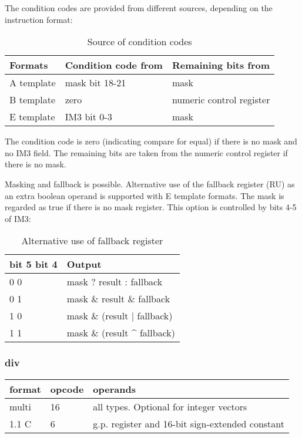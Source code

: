 \documentclass[forwardcom.tex]{subfiles}
\begin{document}
\vspace{2mm}
The condition codes are provided from different sources, depending on the instruction format:

\begin{longtable} {|p{25mm}|p{50mm}|p{50mm}|}
\caption{Source of condition codes} 
\label{table:SourceOfConditionCodes} \\
\endfirsthead
\endhead
\hline
\bfseries Formats & \bfseries Condition code from & \bfseries Remaining bits from \\
\hline
A template & mask bit 18-21 & mask \\
\hline
B template & zero & numeric control register \\
\hline
E template & IM3 bit 0-3 & mask \\
\hline
\end{longtable}

The condition code is zero (indicating compare for equal) if there is no mask and no IM3 field. The remaining bits are taken from the numeric control register if there is no mask.

\vspace{2mm}
Masking and fallback is possible. Alternative use of the fallback register (RU) as an extra boolean operand is supported with E template formats. The mask is regarded as true if there is no mask register.
This option is controlled by bits 4-5 of IM3:

\begin{longtable} {|p{25mm}|p{80mm}|}
\caption{Alternative use of fallback register} 
\label{table:AlternativeFallbackForCompare} \\
\endfirsthead
\endhead
\hline
\bfseries bit 5 bit 4 & \bfseries Output \\
\hline
\hspace{5mm} 0 0 & mask ? result : fallback \\
\hline
\hspace{5mm} 0 1 & mask \& result \& fallback \\
\hline
\hspace{5mm} 1 0 & mask \& (result $|$ fallback) \\
\hline
\hspace{5mm} 1 1 & mask \& (result \^{} fallback) \\
\hline
\end{longtable}
\vspace{2mm}

\subsubsection{div}
\label{table:divInstruction}
\begin{tabular}{|p{12mm}|p{12mm}|p{110mm}|}
\hline
\bfseries format & \bfseries opcode & \bfseries operands \\ \hline
multi & 16 & all types. Optional for integer vectors \\ \hline
1.1 C &  6 & g.p. register and 16-bit sign-extended constant \\ \hline
\end{tabular}
\vspace{2mm}
\end{document}
